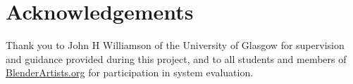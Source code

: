\section*{Acknowledgements}

Thank you to John H Williamson of the University of Glasgow for supervision and guidance provided during this project, and to all students and members of \url{BlenderArtists.org} for participation in system evaluation.